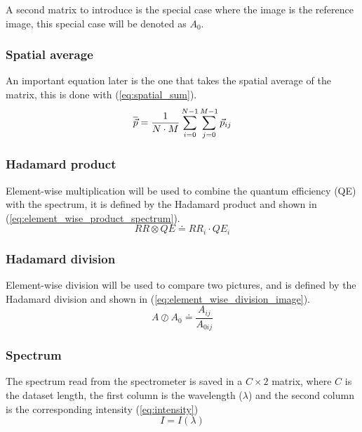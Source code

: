 A second matrix to introduce is the special case where the image is the reference image, this special case will be denoted as $A_0$.

\subsubsection{Spatial average}
\label{sec:spatial_average}

An important equation later is the one that takes the spatial average of the matrix, this is done with (\ref{eq:spatial_sum}).
\begin{equation}
    \label{eq:spatial_sum}
    \overline{\vec{p}} = \frac{1}{N \cdot M} \sum_{i=0}^{N-1} \sum_{j=0}^{M-1} \vec{p}_{ij}
\end{equation}

\subsubsection{Hadamard product}
\label{sec:hadamard_product}
Element-wise multiplication will be used to combine the quantum efficiency (QE) with the spectrum, it is defined by the Hadamard product \cite{millionIntroductionBasicResults} and shown in (\ref{eq:element_wise_product_spectrum}).
\begin{equation}
    \label{eq:element_wise_product_spectrum}
    RR \otimes QE \doteq RR_i \cdot QE_i
\end{equation}

\subsubsection{Hadamard division}
\label{sec:hadamard_division}
Element-wise division will be used to compare two pictures, and is defined by the Hadamard division \cite{HadamardDivisionInfixed} and shown in (\ref{eq:element_wise_division_image}).
\begin{equation}
    \label{eq:element_wise_division_image}
    A \oslash  A_0 \doteq  \frac{A_{ij}}{A_{0ij} } %
\end{equation}


\subsubsection{Spectrum}
\label{sec:spectrum}

The spectrum read from the spectrometer is saved in a $C \times 2$ matrix, where $C$ is the dataset length, the first column is the wavelength ($\lambda$) and the second column is the corresponding intensity (\ref{eq:intensity})
\begin{equation}
    \label{eq:intensity}
    I = I(\lambda)    
\end{equation}

